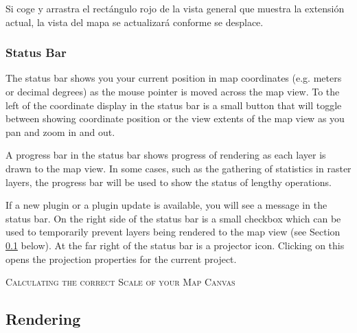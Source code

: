 Si coge y arrastra el rectángulo rojo de la vista general que muestra la extensión actual, la vista 
del mapa se actualizará conforme se desplace.

\subsubsection{Status Bar}\label{label_statusbar}

The status bar shows you your current position in map coordinates (e.g.
meters or decimal degrees) as the mouse pointer is moved across the map view.
To the left of the coordinate display in the status bar is a small button that 
will toggle between showing coordinate position or the view extents of the 
map view as you pan and zoom in and out. 

A progress bar in the status bar shows progress of rendering
as each layer is drawn to the map view. In some cases, such as the gathering
of statistics in raster layers, the progress bar will be used to show the
status of lengthy operations. 

If a new plugin or a plugin update is available, you will see a message in the 
status bar. On the right side of the status bar is a small
checkbox which can be used to temporarily prevent layers being rendered to the
map view (see Section \ref{subsec:redraw_events} below). At the far right of
the status bar is a projector icon. Clicking on this opens the projection
properties for the current project.

\begin{Tip}\caption{\textsc{Calculating the correct Scale of your Map Canvas}}
\end{Tip}

\subsection{Rendering}\label{subsec:redraw_events}

